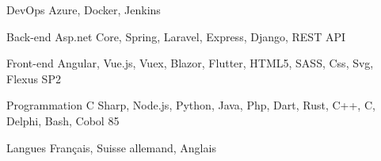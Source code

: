 

\begin{cvskills}

  \cvskill
    {DevOps} %
    {Azure, Docker, Jenkins} %

  \cvskill
    {Back-end} %
    {Asp.net Core, Spring, Laravel, Express, Django, REST API} %

  \cvskill
    {Front-end} %
    {Angular, Vue.js, Vuex, Blazor, Flutter, HTML5, SASS, Css, Svg, Flexus SP2} %

  \cvskill
    {Programmation} %
    {C Sharp, Node.js, Python, Java, Php, Dart, Rust, C++, C, Delphi, Bash, Cobol 85} %

  \cvskill
    {Langues} %
    {Français, Suisse allemand, Anglais} %

\end{cvskills}
